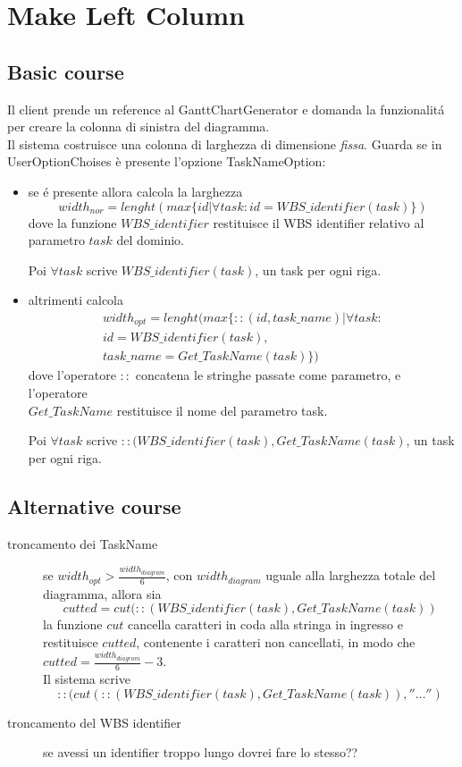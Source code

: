 \section{Make Left Column}
\label{seq:GanttMakeLeftColumn}
\subsection{Basic course}
Il client prende un reference al GanttChartGenerator e domanda la funzionalit\'a
per creare la colonna di sinistra del diagramma. \\
Il sistema costruisce una colonna di larghezza di dimensione \emph{fissa}.
Guarda se in UserOptionChoises \`e presente l'opzione TaskNameOption:
\begin{itemize}
  \item se \'e presente allora calcola la larghezza
\begin{displaymath}
	width_{nor}=lenght(max\lbrace id | \forall task: id =
WBS\_identifier(task) \rbrace) 
\end{displaymath}
dove la funzione $WBS\_identifier$ restituisce il WBS identifier relativo al 
parametro $task$ del dominio.

Poi $\forall task$ scrive $WBS\_identifier(task)$, un task per ogni riga.

\item altrimenti calcola
\begin{eqnarray}
width_{opt}=lenght(max\lbrace ::(id, task\_name) | \forall task: \\ id =
WBS\_identifier(task), \\ task\_name = Get\_TaskName(task)
\rbrace)
\end{eqnarray}
dove l'operatore $::$ concatena le stringhe passate come parametro, e
l'operatore \\$Get\_TaskName$ restituisce il nome del parametro
task.

Poi $\forall task$ scrive $::(WBS\_identifier(task), Get\_TaskName(task)$, un
task per ogni riga.
\end{itemize}

\subsection{Alternative course}
\begin{description}
\item[troncamento dei TaskName] se $width_{opt} >
\frac{width_{diagram}}{6}$, con $width_{diagram}$ uguale alla larghezza totale
del diagramma, allora sia 
\begin{equation}cutted = cut(::(WBS\_identifier(task),
Get\_TaskName(task))\end{equation} 
la funzione $cut$ cancella caratteri in coda alla stringa in ingresso e
restituisce $cutted$, contenente i caratteri non cancellati, in modo che $cutted
= \frac{width_{diagram}}{6}-3$. \\ Il sistema scrive 
\begin{equation} 
::(cut(::(WBS\_identifier(task), Get\_TaskName(task)), ''\ldots'')
\end{equation}
\item[troncamento del WBS identifier] se avessi un identifier troppo lungo
dovrei fare lo stesso??
\end{description}